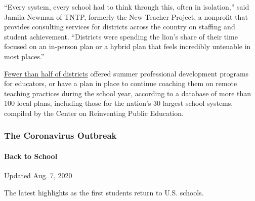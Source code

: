 ``Every system, every school had to think through this, often in
isolation,'' said Jamila Newman of TNTP, formerly the New Teacher
Project, a nonprofit that provides consulting services for districts
across the country on staffing and student achievement. ``Districts were
spending the lion's share of their time focused on an in-person plan or
a hybrid plan that feels incredibly untenable in most places.''

\href{https://www.crpe.org/current-research/covid-19-school-closures}{Fewer
than half of districts} offered summer professional development programs
for educators, or have a plan in place to continue coaching them on
remote teaching practices during the school year, according to a
database of more than 100 local plans, including those for the nation's
30 largest school systems, compiled by the Center on Reinventing Public
Education.

\hypertarget{the-coronavirus-outbreak}{%
\subsubsection{The Coronavirus
Outbreak}\label{the-coronavirus-outbreak}}

\hypertarget{back-to-school}{%
\paragraph{Back to School}\label{back-to-school}}

Updated Aug. 7, 2020

The latest highlights as the first students return to U.S. schools.

